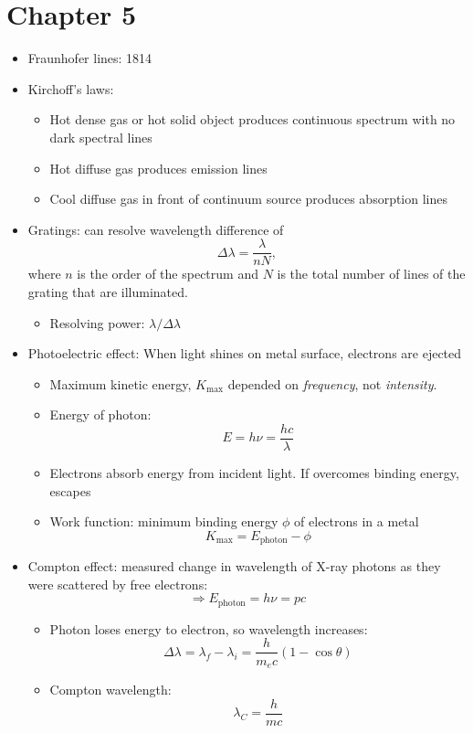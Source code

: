 \documentclass[12pt]{article}
\begin{document}
\section*{Chapter 5}
\begin{itemize}
\item Fraunhofer lines: 1814
\item Kirchoff's laws:
\begin{itemize}
\item Hot dense gas or hot solid object produces continuous spectrum with no dark spectral lines
\item Hot diffuse gas produces emission lines
\item Cool diffuse gas in front of continuum source produces absorption lines
\end{itemize}
\item Gratings: can resolve wavelength difference of
\begin{equation}
\Delta \lambda = \frac{\lambda}{nN},
\end{equation}
where $n$ is the order of the spectrum and $N$ is the total number of lines of the grating that are illuminated.
\begin{itemize}
\item Resolving power: $\lambda/\Delta\lambda$
\end{itemize}
\item Photoelectric effect: When light shines on metal surface, electrons are ejected
\begin{itemize}
\item Maximum kinetic energy, $K_\text{max}$ depended on {\it frequency}, not {\it intensity}.
\item Energy of photon:
\begin{equation}
E = h\nu = \frac{hc}{\lambda}
\end{equation}
\item Electrons absorb energy from incident light. If overcomes binding energy, escapes
\item Work function: minimum binding energy $\phi$ of electrons in a metal
\begin{equation}
K_\text{max} = E_\text{photon} - \phi
\end{equation}
\end{itemize}
\item Compton effect: measured change in wavelength of X-ray photons as they were scattered by free electrons:
\begin{equation}
\Longrightarrow E_\text{photon} = h\nu = pc
\end{equation}
\begin{itemize}
\item Photon loses energy to electron, so wavelength increases:
\begin{equation}
\Delta \lambda = \lambda_f - \lambda_i = \frac{h}{m_e c}(1 - \cos\theta)
\end{equation}
\item Compton wavelength:
\begin{equation}
\lambda_C = \frac{h}{m c}
\end{equation}
\end{itemize}


\end{itemize}
\end{document}
